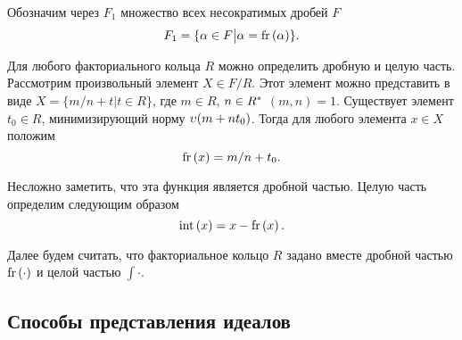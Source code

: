 \documentclass[_00_dissertation.tex]{subfiles}
\begin{document}
\begin{definition}
    Обозначим через $F_1$ множество всех несократимых дробей $F$
    \begin{equation*}
        F_1 = \{
            \alpha \in F \big| \alpha = \textrm{fr}\left(\alpha\right)
        \}.
    \end{equation*}
\end{definition}

\begin{remark}\label{remark:easy_fr}
    Для любого факториального кольца $R$ можно определить дробную и целую часть.
    Рассмотрим произвольный элемент $X \in F/R$.
    Этот элемент можно представить в виде $X = \{m/n + t | t \in R\}$, где $m \in R$, $n \in R^{*}$ $(m, n) = 1$.
    Существует элемент $t_0 \in R$, минимизирующий норму $\upsilon(m + n t_0)$.
    Тогда для любого элемента $x \in X$ положим
    \begin{equation*}
        \textrm{fr}\left(x\right) = m/n + t_0.
    \end{equation*}

    Несложно заметить, что эта функция является дробной частью.
    Целую часть определим следующим образом
    \begin{equation*}
        \textrm{int}\left(x\right) = x - \textrm{fr}\left(x\right).
    \end{equation*}
\end{remark}

Далее будем считать, что факториальное кольцо $R$ задано вместе дробной частью $\textrm{fr}\left(\cdot\right)$ и целой частью $\int{\cdot}$.

\subsection{Способы представления идеалов}



    
\end{document}
